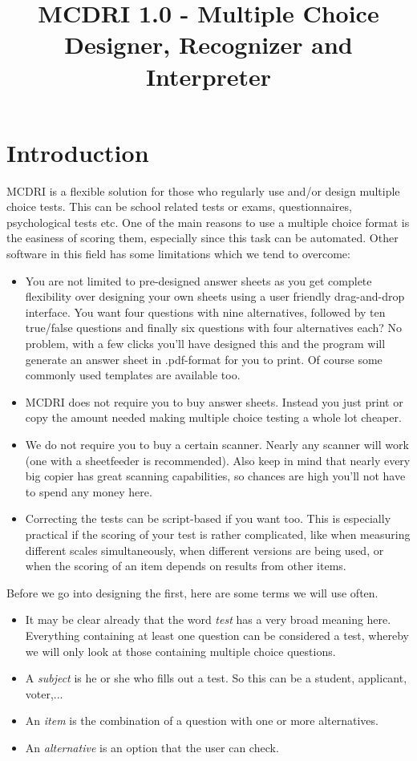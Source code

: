 \documentclass[10pt,a4paper]{article}
\title{MCDRI 1.0 - Multiple Choice Designer, Recognizer and Interpreter}
\date{}
\newcommand{\name}{MCDRI }
\begin{document}
\maketitle
\tableofcontents

\section{Introduction}

\name is a flexible solution for those who regularly use and/or design multiple choice tests. This can be school related tests or exams, questionnaires, psychological tests etc. One of the main reasons to use a multiple choice format is the easiness of scoring them, especially since this task can be automated. Other software in this field has some limitations which we tend to overcome:
\begin{itemize}
\item You are not limited to pre-designed answer sheets as you get complete flexibility over designing your own sheets using a user friendly drag-and-drop interface. You want four questions with nine alternatives, followed by ten true/false questions and finally six questions with four alternatives each? No problem, with a few clicks you'll have designed this and the program will generate an answer sheet in .pdf-format for you to print. Of course some commonly used templates are available too. %
\item \name does not require you to buy answer sheets. Instead you just print or copy the amount needed making multiple choice testing a whole lot cheaper.
\item We do not require you to buy a certain scanner. Nearly any scanner will work (one with a sheetfeeder is recommended). Also keep in mind that nearly every big copier has great scanning capabilities, so chances are high you'll not have to spend any money here.
\item Correcting the tests can be script-based if you want too. This is especially practical if the scoring of your test is rather complicated, like when measuring different scales simultaneously, when different versions are being used, or when the scoring of an item depends on results from other items.
\end{itemize}

Before we go into designing the first, here are some terms we will use often.
\begin{itemize}
\item It may be clear already that the word \emph{test} has a very broad meaning here. Everything containing at least one question can be considered a test, whereby we will only look at those containing multiple choice questions.
\item A \emph{subject} is he or she who fills out a test. So this can be a student, applicant, voter,...
\item An \emph{item} is the combination of a question with one or more alternatives. 
\item An \emph{alternative} is an option that the user can check. 
\end{itemize}
\end{document}
